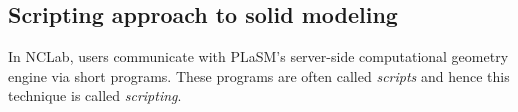 \subsection{Scripting approach to solid modeling}\label{subsec:scripting}


In NCLab, users communicate with PLaSM's server-side computational geometry engine 
via short programs. These programs are often called 
{\em scripts} and hence this technique is called {\em scripting}.




